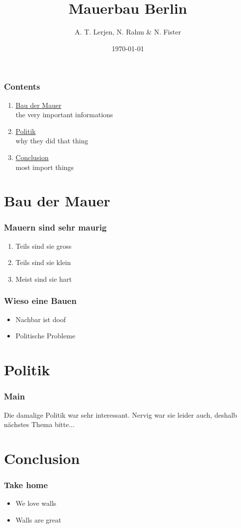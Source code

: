 \documentclass[aspectratio=169]{beamer}
\title{Mauerbau Berlin}
\author{A. T. Lerjen, N. Rahm \& N. Fister}
\date{\today}
\begin{document}
	\setcounter{showProgressBar}{0}
	\setcounter{showSlideNumbers}{0}

	\frame{\titlepage}

	\begin{frame}
		\frametitle{Contents}
		\begin{enumerate}
			\item \hyperlink{sec:one}{Bau der Mauer} \\ \textcolor{ExecusharesGrey}{\footnotesize\hspace{1em} the very important informations}
			\item \hyperlink{sec:two}{Politik}   \\ \textcolor{ExecusharesGrey}{\footnotesize\hspace{1em} why they did that thing}
			\item \hyperlink{sec:three}{Conclusion} \\ \textcolor{ExecusharesGrey}{\footnotesize\hspace{1em} most import things}
		\end{enumerate}
	\end{frame}

	\setcounter{framenumber}{0}
	\setcounter{showProgressBar}{1}
	\setcounter{showSlideNumbers}{1}
	\section{\hypertarget{sec:one}{Bau der Mauer}}
		\begin{frame}
			\frametitle{Mauern sind sehr maurig}
			\begin{enumerate}
				\item Teils sind sie gross
				\item Teils sind sie klein
				\item Meist sind sie hart
			\end{enumerate}
		\end{frame}

		\begin{frame}
			\frametitle{Wieso eine Bauen}
			\begin{itemize}
				\item Nachbar ist doof
				\item Politische Probleme
			\end{itemize}
		\end{frame}

	\section{\hypertarget{sec:two}{Politik}}
		\begin{frame}
			\frametitle{Main}
			Die damalige Politik war sehr interessant. Nervig war sie leider auch, deshalb nächstes Thema bitte...
		\end{frame}

	\section{\hypertarget{sec:three}{Conclusion}}
		\begin{frame}
			\frametitle{Take home}
			\begin{itemize}
				\item We love walls
				\item Walls are great
			\end{itemize}
		\end{frame}
	
	\appendix
\end{document}
